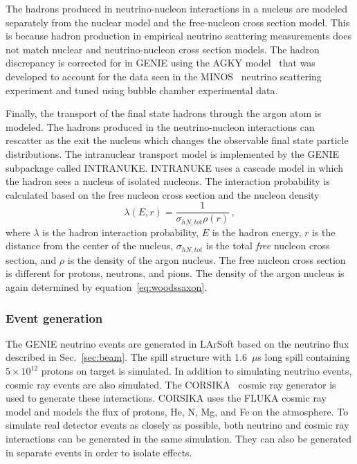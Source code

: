     The hadrons produced in neutrino-nucleon interactions in a nucleus are
    modeled separately from the nuclear model and the free-nucleon cross
    section model. This is because hadron production in empirical neutrino
    scattering measurements does not match nuclear and neutrino-nucleon cross
    section models. The hadron discrepancy is corrected for in GENIE using the
    AGKY model~\cite{AGKY} that was developed to account for the data seen in
    the MINOS~\cite{MINOS} neutrino scattering experiment and tuned using
    bubble chamber experimental data.

    Finally, the transport of the final state hadrons through the argon atom is
    modeled. The hadrons produced in the neutrino-nucleon interactions can
    rescatter as the exit the nucleus which changes the observable final state
    particle distributions. The intranuclear transport model is implemented by
    the GENIE subpackage called INTRANUKE. INTRANUKE uses a cascade model in
    which the hadron sees a nucleus of isolated nucleons. The interaction
    probability is calculated based on the free nucleon cross section and the
    nucleon density~\cite{Andreopoulos:2015wxa}
    \begin{equation}
      \lambda(E,r) = \frac{1}{\sigma_{hN,tot} \rho(r)} \,,
    \end{equation}
    where $\lambda$ is the hadron interaction probability, $E$ is the hadron
    energy, $r$ is the distance from the center of the nucleus,
    $\sigma_{hN,tot}$ is the total \textit{free} nucleon cross section, and
    $\rho$ is the density of the argon nucleus. The free nucleon cross section
    is different for protons, neutrons, and pions. The density of the argon
    nucleus is again determined by equation~\ref{eq:woodssaxon}.

  \subsubsection{Event generation}
    The GENIE neutrino events are generated in LArSoft based on the neutrino
    flux described in Sec.~\ref{sec:beam}. The spill structure with 1.6~$\mu$s
    long spill containing $5\times 10^{12}$ protons on target is simulated.  In
    addition to simulating neutrino events, cosmic ray events are also
    simulated. The CORSIKA~\cite{corsika} cosmic ray generator is used to
    generate these interactions. CORSIKA uses the FLUKA cosmic ray model and
    models the flux of protons, He, N, Mg, and Fe on the atmosphere.  To
    simulate real detector events as closely as possible, both neutrino and
    cosmic ray interactions can be generated in the same simulation. They can
    also be generated in separate events in order to isolate effects.

